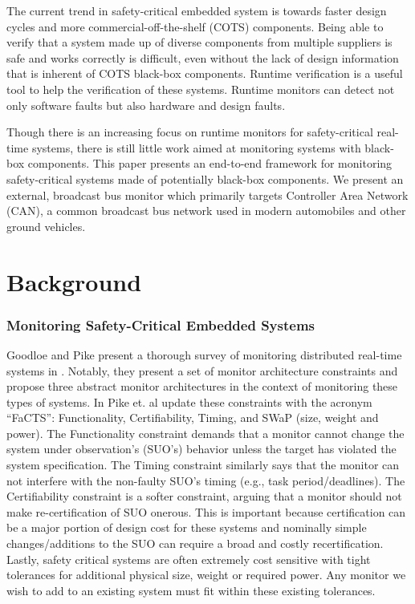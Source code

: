 \documentclass[]{llncs}
\begin{document}
The current trend in safety-critical embedded system is towards faster design cycles and more commercial-off-the-shelf (COTS) components. Being able to verify that a system made up of diverse components from multiple suppliers is safe and works correctly is difficult, even without the lack of design information that is inherent of COTS black-box components.
%
Runtime verification is a useful tool to help the verification of these systems. Runtime monitors can detect not only software faults but also hardware and design faults. 

Though there is an increasing focus on runtime monitors for safety-critical real-time systems, there is still little work aimed at monitoring systems with black-box components. This paper presents an end-to-end framework for monitoring safety-critical systems made of potentially black-box components. 
We present an external, broadcast bus monitor which primarily targets Controller Area Network (CAN), a common broadcast bus network used in modern automobiles and other ground vehicles. 

%
% 
%
%

\section{Background}

\subsubsection{Monitoring Safety-Critical Embedded Systems}
\label{sec:bg:sc_monitor}
Goodloe and Pike present a thorough survey of monitoring distributed real-time systems in \cite{Goodloe2010}. Notably, they present a set of monitor architecture constraints and propose three abstract monitor architectures in the context of monitoring these types of systems.
%
In \cite{Pike2011} Pike et. al update these constraints with the acronym ``FaCTS'': Functionality, Certifiability, Timing, and SWaP (size, weight and power). 
The Functionality constraint demands that a monitor cannot change the system under observation's (SUO's) behavior unless the target has violated the system specification. 
The Timing constraint similarly says that the monitor can not interfere with the non-faulty SUO's timing (e.g., task period/deadlines).
The Certifiability constraint is a softer constraint, arguing that a monitor should not make re-certification of SUO onerous. This is important because certification can be a major portion of design cost for these systems and nominally simple changes/additions to the SUO can require a broad and costly recertification.
Lastly, safety critical systems are often extremely cost sensitive with tight tolerances for additional physical size, weight or required power. Any monitor we wish to add to an existing system must fit within these existing tolerances.
\end{document}

